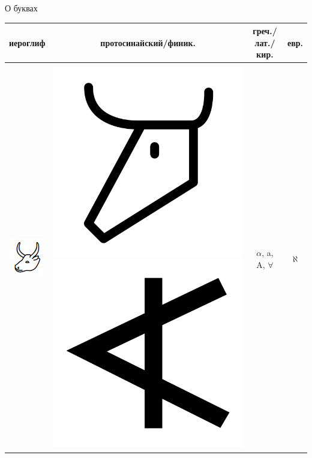 \documentclass[aspectratio=169]{beamer}
\begin{document}
\begin{frame}[fragile]{О буквах}
\footnotesize
\begin{center}
\begin{tabular}{c|c|c|c}
 иероглиф &  протосинайский/финик. &  греч./лат./кир. &  евр.\\\hline
&&&\\
\includegraphics[scale=0.25]{pics/lection-14-ox} &
    \includegraphics[scale=0.015]{pics/lection-14-ph-aleph-proto}
    \includegraphics[scale=0.01]{pics/lection-14-ph-aleph}&  \Large $\alpha$, a, A, $\forall$  &  \Large $\aleph$\\

\end{tabular}
\end{center}
\end{frame}
\end{document}
